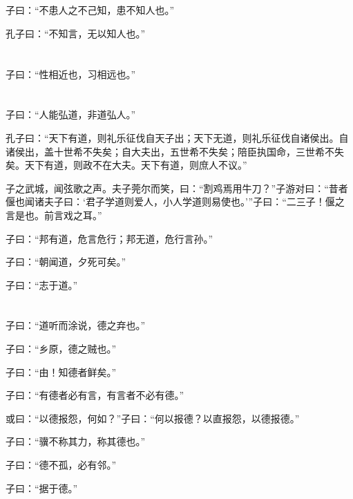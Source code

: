 \documentclass[a5paper]{ctexbook}
\begin{document}
    \chapter{}

    子曰：“不患人之不己知，患不知人也。”

    孔子曰：“不知言，无以知人也。”

    \chapter{}

    子曰：“性相近也，习相远也。”

    \chapter{}

    子曰：“人能弘道，非道弘人。” 

    孔子曰：“天下有道，则礼乐征伐自天子出；天下无道，则礼乐征伐自诸侯出。自诸侯出，盖十世希不失矣；自大夫出，五世希不失矣；陪臣执国命，三世希不失矣。天下有道，则政不在大夫。天下有道，则庶人不议。”

    子之武城，闻弦歌之声。夫子莞尔而笑，曰：“割鸡焉用牛刀？”子游对曰：“昔者偃也闻诸夫子曰：‘君子学道则爱人，小人学道则易使也。’”子曰：“二三子！偃之言是也。前言戏之耳。”

    子曰：“邦有道，危言危行；邦无道，危行言孙。”

    子曰：“朝闻道，夕死可矣。”

    子曰：“志于道。”

    \chapter{}

    子曰：“道听而涂说，德之弃也。”

    子曰：“乡原，德之贼也。”

    子曰：“由！知德者鲜矣。”

    子曰：“有德者必有言，有言者不必有德。”

    或曰：“以德报怨，何如？”子曰：“何以报德？以直报怨，以德报德。”

    子曰：“骥不称其力，称其德也。”

    子曰：“德不孤，必有邻。”

    子曰：“据于德。”

    \chapter{}
\end{document}
